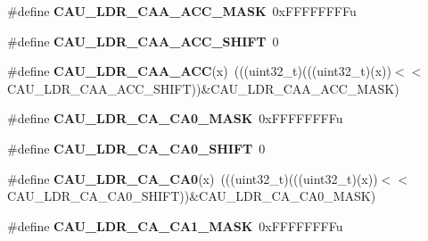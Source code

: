\begin{DoxyCompactItemize}
\item 
\#define {\bfseries C\+A\+U\+\_\+\+L\+D\+R\+\_\+\+C\+A\+A\+\_\+\+A\+C\+C\+\_\+\+M\+A\+SK}~0x\+F\+F\+F\+F\+F\+F\+F\+Fu\hypertarget{group__CAU__Register__Masks_ga25d23cb2902598fd7377214fc4c831c4}{}\label{group__CAU__Register__Masks_ga25d23cb2902598fd7377214fc4c831c4}

\item 
\#define {\bfseries C\+A\+U\+\_\+\+L\+D\+R\+\_\+\+C\+A\+A\+\_\+\+A\+C\+C\+\_\+\+S\+H\+I\+FT}~0\hypertarget{group__CAU__Register__Masks_ga3d0a4b449aa40e73d9ef6540832fec08}{}\label{group__CAU__Register__Masks_ga3d0a4b449aa40e73d9ef6540832fec08}

\item 
\#define {\bfseries C\+A\+U\+\_\+\+L\+D\+R\+\_\+\+C\+A\+A\+\_\+\+A\+CC}(x)~(((uint32\+\_\+t)(((uint32\+\_\+t)(x))$<$$<$C\+A\+U\+\_\+\+L\+D\+R\+\_\+\+C\+A\+A\+\_\+\+A\+C\+C\+\_\+\+S\+H\+I\+FT))\&C\+A\+U\+\_\+\+L\+D\+R\+\_\+\+C\+A\+A\+\_\+\+A\+C\+C\+\_\+\+M\+A\+SK)\hypertarget{group__CAU__Register__Masks_ga4a805225201daa70b2aa5c3d47634361}{}\label{group__CAU__Register__Masks_ga4a805225201daa70b2aa5c3d47634361}

\item 
\#define {\bfseries C\+A\+U\+\_\+\+L\+D\+R\+\_\+\+C\+A\+\_\+\+C\+A0\+\_\+\+M\+A\+SK}~0x\+F\+F\+F\+F\+F\+F\+F\+Fu\hypertarget{group__CAU__Register__Masks_ga15ab69e214b180e4459b220f28db6671}{}\label{group__CAU__Register__Masks_ga15ab69e214b180e4459b220f28db6671}

\item 
\#define {\bfseries C\+A\+U\+\_\+\+L\+D\+R\+\_\+\+C\+A\+\_\+\+C\+A0\+\_\+\+S\+H\+I\+FT}~0\hypertarget{group__CAU__Register__Masks_ga3f71ad6211265982fcdc2aa519a357c7}{}\label{group__CAU__Register__Masks_ga3f71ad6211265982fcdc2aa519a357c7}

\item 
\#define {\bfseries C\+A\+U\+\_\+\+L\+D\+R\+\_\+\+C\+A\+\_\+\+C\+A0}(x)~(((uint32\+\_\+t)(((uint32\+\_\+t)(x))$<$$<$C\+A\+U\+\_\+\+L\+D\+R\+\_\+\+C\+A\+\_\+\+C\+A0\+\_\+\+S\+H\+I\+FT))\&C\+A\+U\+\_\+\+L\+D\+R\+\_\+\+C\+A\+\_\+\+C\+A0\+\_\+\+M\+A\+SK)\hypertarget{group__CAU__Register__Masks_gadf71509a7bc1b885aa95d7adf16ffc3d}{}\label{group__CAU__Register__Masks_gadf71509a7bc1b885aa95d7adf16ffc3d}

\item 
\#define {\bfseries C\+A\+U\+\_\+\+L\+D\+R\+\_\+\+C\+A\+\_\+\+C\+A1\+\_\+\+M\+A\+SK}~0x\+F\+F\+F\+F\+F\+F\+F\+Fu\hypertarget{group__CAU__Register__Masks_ga5dac734b52c32cbb41f3daafa6d85e9e}{}\label{group__CAU__Register__Masks_ga5dac734b52c32cbb41f3daafa6d85e9e}


\end{DoxyCompactItemize}
